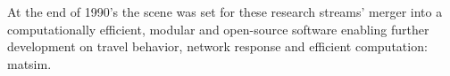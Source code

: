 

At the end of 1990’s the scene was set for these research streams' merger into a computationally efficient, modular and open-source software enabling further development on travel behavior, network response and efficient computation: \gls{matsim}.




%

